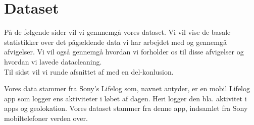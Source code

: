 \chapter{Dataset}
På de følgende sider vil vi gennnemgå vores dataset. Vi vil vise de basale statistikker over det pågældende data vi har arbejdet med og gennemgå afvigelser. Vi vil også gennemgå hvordan vi forholder os til disse afvigelser og hvordan vi lavede datacleaning. \\
Til sidst vil vi runde afsnittet af med en del-konlusion. 

Vores data stammer fra Sony's Lifelog\cite{sonyLifeLog} som, navnet antyder, er en mobil Lifelog app som logger ens aktiviteter i løbet af dagen. Heri logger den bla. aktivitet i apps og geolokation. Vores dataset stammer fra denne app, indsamlet fra Sony mobiltelefoner verden over. %



